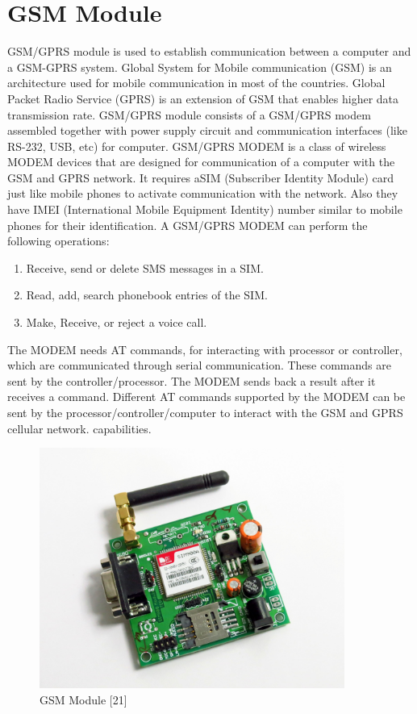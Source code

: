 \documentclass[twoside,a4paper,16pt]{book}
\begin{document}
{{			\section{GSM Module }
			GSM/GPRS module is used to establish communication between a computer and a GSM-GPRS system. Global System for Mobile communication (GSM) is an architecture used for mobile communication in most of the countries. Global Packet Radio Service (GPRS) is an extension of GSM that enables higher data transmission rate. GSM/GPRS module consists of a GSM/GPRS modem assembled together with power supply circuit and communication interfaces (like RS-232, USB, etc) for computer. GSM/GPRS MODEM is a class of wireless MODEM devices that are designed for communication of a computer with the GSM and GPRS network. It requires aSIM (Subscriber Identity Module) card just like mobile phones to activate communication with the network. Also they have IMEI (International Mobile Equipment Identity) number similar to mobile phones for their identification. A GSM/GPRS MODEM can perform the following operations: 
			\begin{enumerate}
				\item Receive, send or delete SMS messages in a SIM.
				\item Read, add, search phonebook entries of the SIM.
				\item Make, Receive, or reject a voice call.
			\end{enumerate}
			
			
			The MODEM needs AT commands, for interacting with processor or controller, which are communicated through serial communication. These commands are sent by the controller/processor. The MODEM sends back a result after it receives a command. Different AT commands supported by the MODEM can be sent by the processor/controller/computer to interact with the GSM and GPRS cellular network. capabilities.
			\begin{figure}[ht!]
				\begin{center}
					\includegraphics[width=10.0cm]{12.jpg}
					\caption{GSM Module [21]}
				\end{center}
			\end{figure}
}}
\end{document}
